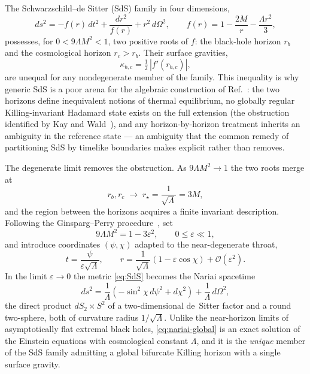 \documentclass[11pt]{article}
\newcommand{\Nariai}{Nariai}
\begin{document}
The Schwarzschild--de Sitter (SdS) family in four dimensions,
\begin{equation}
ds^2 = -f(r)\,dt^2 + \frac{dr^2}{f(r)} + r^2\, d\Omega^2,
\qquad
f(r) = 1 - \frac{2M}{r} - \frac{\Lambda r^2}{3},
\label{eq:SdS}
\end{equation}
possesses, for $0 < 9\Lambda M^2 < 1$, two positive roots of $f$: the black-hole horizon $r_b$ and the cosmological horizon $r_c > r_b$. Their surface gravities,
\begin{equation}
\kappa_{b,c} = \tfrac{1}{2}\,|f'(r_{b,c})|,
\end{equation}
are unequal for any nondegenerate member of the family. This inequality is why generic SdS is a poor arena for the algebraic construction of Ref.~\cite{DorauMuch}: the two horizons define inequivalent notions of thermal equilibrium, no globally regular Killing-invariant Hadamard state exists on the full extension (the obstruction identified by Kay and Wald~\cite{KayWald}), and any horizon-by-horizon treatment inherits an ambiguity in the reference state --- an ambiguity that the common remedy of partitioning SdS by timelike boundaries \cite{Rusalev} makes explicit rather than removes.

The degenerate limit removes the obstruction. As $9\Lambda M^2 \to 1$ the two roots merge at
\begin{equation}
r_b, r_c \;\to\; r_\star = \frac{1}{\sqrt{\Lambda}} = 3M,
\end{equation}
and the region between the horizons acquires a finite invariant description. Following the Ginsparg--Perry procedure~\cite{GinspargPerry}, set
\begin{equation}
9\Lambda M^2 = 1 - 3\varepsilon^2, \qquad 0 \le \varepsilon \ll 1,
\end{equation}
and introduce coordinates $(\psi, \chi)$ adapted to the near-degenerate throat,
\begin{equation}
t = \frac{\psi}{\varepsilon\sqrt{\Lambda}},
\qquad
r = \frac{1}{\sqrt{\Lambda}}\left(1 - \varepsilon\cos\chi \right) + \mathcal{O}(\varepsilon^2).
\end{equation}
In the limit $\varepsilon \to 0$ the metric \eqref{eq:SdS} becomes the \Nariai{} spacetime~\cite{Nariai}
\begin{equation}
ds^2 = \frac{1}{\Lambda}\left(-\sin^2\!\chi \, d\psi^2 + d\chi^2\right) + \frac{1}{\Lambda}\, d\Omega^2 ,
\label{eq:nariai-global}
\end{equation}
the direct product $dS_2 \times S^2$ of a two-dimensional de~Sitter factor and a round two-sphere, both of curvature radius $1/\sqrt{\Lambda}$. Unlike the near-horizon limits of asymptotically flat extremal black holes, \eqref{eq:nariai-global} is an exact solution of the Einstein equations with cosmological constant $\Lambda$, and it is the \emph{unique} member of the SdS family admitting a global bifurcate Killing horizon with a single surface gravity.
\end{document}
